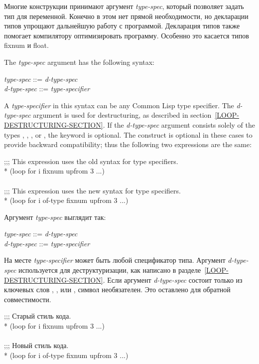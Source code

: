 Многие конструкции принимают аргумент \emph{type-spec}, который
позволяет задать тип для переменной. Конечно в этом нет прямой
необходимости, но декларации типов упрощают дальнейшую работу с
программой. Декларация типов также помогает компилятору оптимизировать
программу. Особенно это касается типов fixnum и float.

The \emph{type-spec\/} argument has the following syntax:
\begin{tabbing}
\emph{type-spec\/} ::=  \emph{d-type-spec} \\
\emph{d-type-spec\/} ::= \emph{type-specifier\/} {\Mor} 
\end{tabbing}
A \emph{type-specifier} in this syntax can be any Common Lisp type
specifier.  The \emph{d-type-spec} argument is used for destructuring,
as described in section~\ref{LOOP-DESTRUCTURING-SECTION}.  If the
\emph{d-type-spec} argument consists solely of the types ,
, , or \nil, the  keyword is optional.  The
 construct is optional in these cases to provide backward
compatibility; thus the following two expressions are the same:
\begin{lisp}
;;; This expression uses the old syntax for type specifiers. \\*
(loop for i fixnum upfrom 3 ...) \\
 \\
;;; This expression uses the new syntax for type specifiers. \\*
(loop for i of-type fixnum upfrom 3 ...)
\end{lisp}

Аргумент \emph{type-spec} выглядит так:
\begin{tabbing}
\emph{type-spec\/} ::=  \emph{d-type-spec} \\
\emph{d-type-spec\/} ::= \emph{type-specifier\/} {\Mor} 
\end{tabbing}
На месте \emph{type-specifier} может быть любой спецификатор
типа. Аргумент \emph{d-type-spec} используется для деструктуризации,
как написано в разделе~\ref{LOOP-DESTRUCTURING-SECTION}. Если аргумент
\emph{d-type-spec} состоит только из ключевых слов ,
,  или \nil, символ  необязателен. Это
оставлено для обратной совместимости.

\begin{lisp}
;;; Старый стиль кода. \\*
(loop for i fixnum upfrom 3 ...) \\
 \\
;;; Новый стиль кода. \\*
(loop for i of-type fixnum upfrom 3 ...)
\end{lisp}

